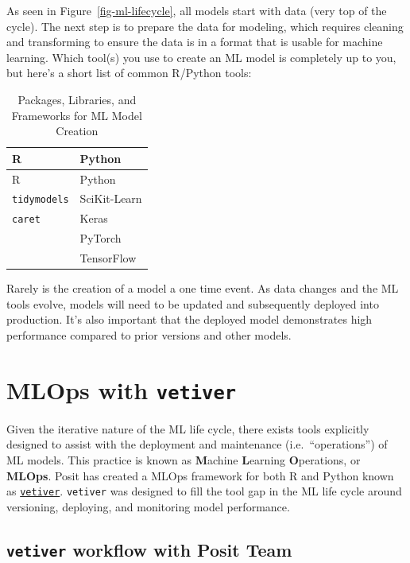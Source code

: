 \documentclass[
  letterpaper,
  DIV=11,
  numbers=noendperiod]{scrreprt}
\begin{document}
As seen in Figure~\ref{fig-ml-lifecycle}, all models start with data
(very top of the cycle). The next step is to prepare the data for
modeling, which requires cleaning and transforming to ensure the data is
in a format that is usable for machine learning. Which tool(s) you use
to create an ML model is completely up to you, but here's a short list
of common R/Python tools:

\begin{longtable}[]{@{}ll@{}}
\caption{Packages, Libraries, and Frameworks for ML Model
Creation}\tabularnewline
\toprule\noalign{}
R & Python \\
\midrule\noalign{}
\endfirsthead
\toprule\noalign{}
R & Python \\
\midrule\noalign{}
\endhead
\bottomrule\noalign{}
\endlastfoot
\texttt{tidymodels} & SciKit-Learn \\
\texttt{caret} & Keras \\
& PyTorch \\
& TensorFlow \\
\end{longtable}

Rarely is the creation of a model a one time event. As data changes and
the ML tools evolve, models will need to be updated and subsequently
deployed into production. It's also important that the deployed model
demonstrates high performance compared to prior versions and other
models.

\section{\texorpdfstring{MLOps with
\texttt{vetiver}}{MLOps with vetiver}}\label{mlops-with-vetiver}

Given the iterative nature of the ML life cycle, there exists tools
explicitly designed to assist with the deployment and maintenance
(i.e.~``operations'') of ML models. This practice is known as
\textbf{M}achine \textbf{L}earning \textbf{O}perations, or
\textbf{MLOps}. Posit has created a MLOps framework for both R and
Python known as \href{https://vetiver.rstudio.com/}{\texttt{vetiver}}.
\texttt{vetiver} was designed to fill the tool gap in the ML life cycle
around versioning, deploying, and monitoring model performance.

\subsection{\texorpdfstring{\texttt{vetiver} workflow with Posit
Team}{vetiver workflow with Posit Team}}\label{vetiver-workflow-with-posit-team}
\end{document}
